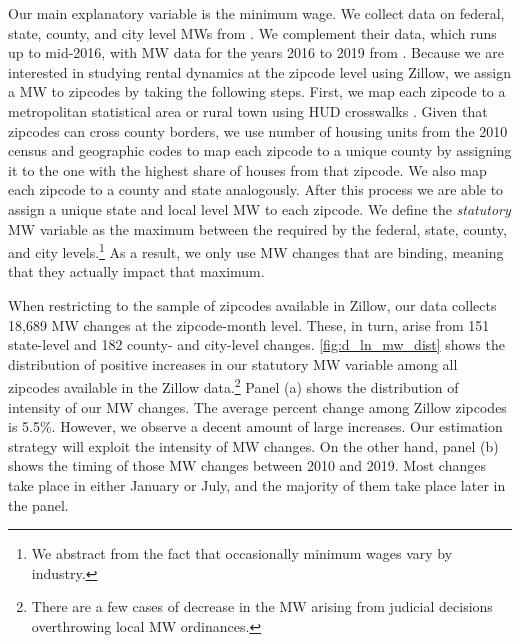 Our main explanatory variable is the minimum wage. We collect data on federal, state, 
county, and city level MWs from \textcite{VaghulZipperer2016}. We complement their data,
which runs up to mid-2016, with MW data for the years 2016 to 2019 from 
\textcite{BerkeleyLaborCenter}. Because  we are interested in studying rental dynamics at 
the zipcode level using Zillow, we assign a MW to zipcodes by taking the following steps.
First, we map each zipcode to a metropolitan statistical area or rural town using HUD 
crosswalks \parencite{hudCrosswalks}. Given that zipcodes can cross county borders, we use 
number of housing units from the 2010 census and geographic codes to map each zipcode to 
a unique county by assigning it to the one with the highest share of houses from that 
zipcode. We also map each zipcode to a county and state analogously. After this process 
we are able to assign a unique state and local level MW to each zipcode. We define the 
\textit{statutory} MW variable as the maximum between the required by the federal, state, 
county, and city levels.\footnote{We abstract from the fact that occasionally minimum 
	wages vary by industry.} %
As a result, we only use MW changes that are binding, meaning that they actually impact 
that maximum. 

When restricting to the sample of zipcodes available in Zillow, our data collects 18,689 MW 
changes at the zipcode-month level. These, in turn, arise from 151 state-level and 182 
county- and city-level changes. 
\autoref{fig:d_ln_mw_dist} shows the distribution of positive increases in our 
statutory MW variable among all zipcodes available in the Zillow data.\footnote{There
	are a few cases of decrease in the MW arising from judicial decisions overthrowing 
	local MW ordinances.}
Panel (a) shows the distribution of intensity of our MW changes. The average percent 
change among Zillow zipcodes is 5.5\%. %
However, we observe a decent amount of large increases. Our estimation strategy will
exploit the intensity of MW changes. On the other hand, panel (b) shows the timing of 
those MW changes between 2010 and 2019. Most changes take place in either January or
July, and the majority of them take place later in the panel.

